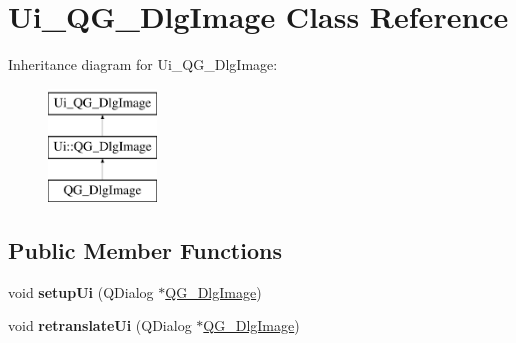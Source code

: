 \hypertarget{classUi__QG__DlgImage}{\section{Ui\-\_\-\-Q\-G\-\_\-\-Dlg\-Image Class Reference}
\label{classUi__QG__DlgImage}
}
Inheritance diagram for Ui\-\_\-\-Q\-G\-\_\-\-Dlg\-Image\-:\begin{figure}[H]
\begin{center}
\leavevmode
\includegraphics[height=3.000000cm]{classUi__QG__DlgImage}
\end{center}
\end{figure}
\subsection*{Public Member Functions}
\begin{DoxyCompactItemize}
\item 
\hypertarget{classUi__QG__DlgImage_a7b03c57a60933f65cdf2638e249a3816}{void {\bfseries setup\-Ui} (Q\-Dialog $\ast$\hyperlink{classQG__DlgImage}{Q\-G\-\_\-\-Dlg\-Image})}\label{classUi__QG__DlgImage_a7b03c57a60933f65cdf2638e249a3816}

\item 
\hypertarget{classUi__QG__DlgImage_af24f149386ea9b7edaf9c62332f1b433}{void {\bfseries retranslate\-Ui} (Q\-Dialog $\ast$\hyperlink{classQG__DlgImage}{Q\-G\-\_\-\-Dlg\-Image})}\label{classUi__QG__DlgImage_af24f149386ea9b7edaf9c62332f1b433}

\end{DoxyCompactItemize}

